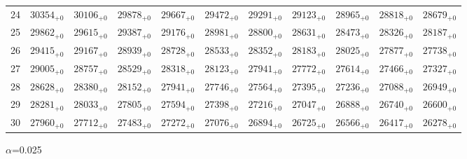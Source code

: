 \documentclass[10pt, a4paper]{article}
\begin{document}
\begin{center}
\begin{tabular}{c || c c c c c | c c c c c}
        24 & \({30354}_{+0}\) & \({30106}_{+0}\) & \({29878}_{+0}\) & \({29667}_{+0}\) & \({29472}_{+0}\) & \({29291}_{+0}\) & \({29123}_{+0}\) & \({28965}_{+0}\) & \({28818}_{+0}\) & \({28679}_{+0}\)\\
        25 & \({29862}_{+0}\) & \({29615}_{+0}\) & \({29387}_{+0}\) & \({29176}_{+0}\) & \({28981}_{+0}\) & \({28800}_{+0}\) & \({28631}_{+0}\) & \({28473}_{+0}\) & \({28326}_{+0}\) & \({28187}_{+0}\)\\
        \hline
        26 & \({29415}_{+0}\) & \({29167}_{+0}\) & \({28939}_{+0}\) & \({28728}_{+0}\) & \({28533}_{+0}\) & \({28352}_{+0}\) & \({28183}_{+0}\) & \({28025}_{+0}\) & \({27877}_{+0}\) & \({27738}_{+0}\)\\
        27 & \({29005}_{+0}\) & \({28757}_{+0}\) & \({28529}_{+0}\) & \({28318}_{+0}\) & \({28123}_{+0}\) & \({27941}_{+0}\) & \({27772}_{+0}\) & \({27614}_{+0}\) & \({27466}_{+0}\) & \({27327}_{+0}\)\\
        28 & \({28628}_{+0}\) & \({28380}_{+0}\) & \({28152}_{+0}\) & \({27941}_{+0}\) & \({27746}_{+0}\) & \({27564}_{+0}\) & \({27395}_{+0}\) & \({27236}_{+0}\) & \({27088}_{+0}\) & \({26949}_{+0}\)\\
        29 & \({28281}_{+0}\) & \({28033}_{+0}\) & \({27805}_{+0}\) & \({27594}_{+0}\) & \({27398}_{+0}\) & \({27216}_{+0}\) & \({27047}_{+0}\) & \({26888}_{+0}\) & \({26740}_{+0}\) & \({26600}_{+0}\)\\
        30 & \({27960}_{+0}\) & \({27712}_{+0}\) & \({27483}_{+0}\) & \({27272}_{+0}\) & \({27076}_{+0}\) & \({26894}_{+0}\) & \({26725}_{+0}\) & \({26566}_{+0}\) & \({26417}_{+0}\) & \({26278}_{+0}\)\\
        \hline
    \end{tabular}
    \pagebreak

    \(\alpha\)=0.025


\end{center}
\end{document}
